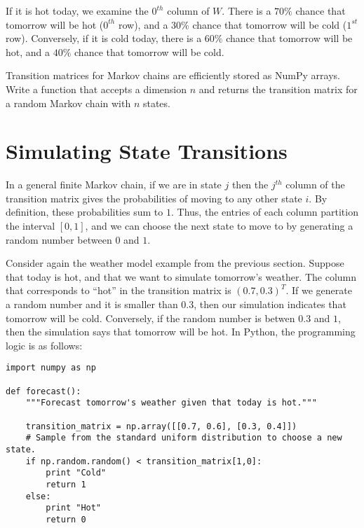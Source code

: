 If it is hot today, we examine the $0^{th}$ column of $W$.
There is a $70\%$ chance that tomorrow will be hot ($0^{th}$ row), and a $30\%$ chance that tomorrow will be cold ($1^{st}$ row).
Conversely, if it is cold today, there is a $60\%$ chance that tomorrow will be hot, and a $40\%$ chance that tomorrow will be cold.

\begin{problem} %
Transition matrices for Markov chains are efficiently stored as NumPy arrays.
Write a function that accepts a dimension $n$ and returns the transition matrix for a random Markov chain with $n$ states.
\end{problem}

\section*{Simulating State Transitions} %

In a general finite Markov chain, if we are in state $j$ then the $j^{th}$ column of the transition matrix gives the probabilities of moving to any other state $i$.
By definition, these probabilities sum to $1$.
Thus, the entries of each column partition the interval $[0, 1]$, and we can choose the next state to move to by generating a random number between $0$ and $1$.

Consider again the weather model example from the previous section.
Suppose that today is hot, and that we want to simulate tomorrow's weather.
The column that corresponds to ``hot'' in the transition matrix is $(0.7, 0.3)^T$.
If we generate a random number and it is smaller than $0.3$, then our simulation indicates that tomorrow will be cold.
Conversely, if the random number is betwen $0.3$ and $1$, then the simulation says that tomorrow will be hot.
In Python, the programming logic is as follows:

\begin{lstlisting}
import numpy as np

def forecast():
	"""Forecast tomorrow's weather given that today is hot."""

	transition_matrix = np.array([[0.7, 0.6], [0.3, 0.4]])
	# Sample from the standard uniform distribution to choose a new state.
	if np.random.random() < transition_matrix[1,0]:
		print "Cold"
		return 1
	else:
		print "Hot"
		return 0
\end{lstlisting}

